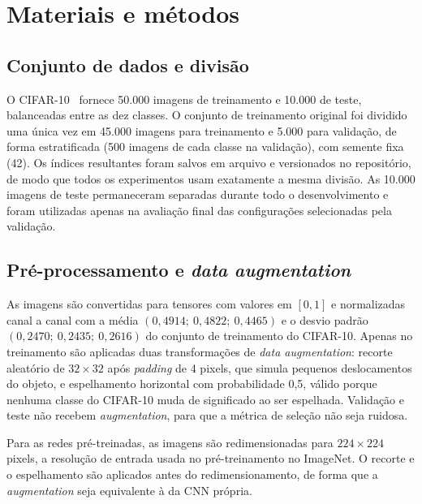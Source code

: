 
\section{Materiais e métodos}
\label{sec:metodos}

\subsection{Conjunto de dados e divisão}

O CIFAR-10~\cite{krizhevsky2009learning} fornece 50.000 imagens de treinamento
e 10.000 de teste, balanceadas entre as dez classes. O conjunto de treinamento
original foi dividido uma única vez em 45.000 imagens para treinamento e 5.000
para validação, de forma estratificada (500 imagens de cada classe na
validação), com semente fixa (42). Os índices resultantes foram salvos em
arquivo e versionados no repositório, de modo que todos os experimentos usam
exatamente a mesma divisão. As 10.000 imagens de teste permaneceram separadas
durante todo o desenvolvimento e foram utilizadas apenas na avaliação final
das configurações selecionadas pela validação.

\subsection{Pré-processamento e \textit{data augmentation}}

As imagens são convertidas para tensores com valores em $[0, 1]$ e
normalizadas canal a canal com a média $(0{,}4914;\ 0{,}4822;\ 0{,}4465)$ e o
desvio padrão $(0{,}2470;\ 0{,}2435;\ 0{,}2616)$ do conjunto de treinamento do
CIFAR-10. Apenas no treinamento são aplicadas duas transformações de
\textit{data augmentation}: recorte aleatório de $32 \times 32$ após
\textit{padding} de 4 pixels, que simula pequenos deslocamentos do objeto, e
espelhamento horizontal com probabilidade 0,5, válido porque nenhuma classe do
CIFAR-10 muda de significado ao ser espelhada. Validação e teste não recebem
\textit{augmentation}, para que a métrica de seleção não seja ruidosa.

Para as redes pré-treinadas, as imagens são redimensionadas para
$224 \times 224$ pixels, a resolução de entrada usada no pré-treinamento no
ImageNet. O recorte e o espelhamento são aplicados antes do redimensionamento,
de forma que a \textit{augmentation} seja equivalente à da CNN própria.

